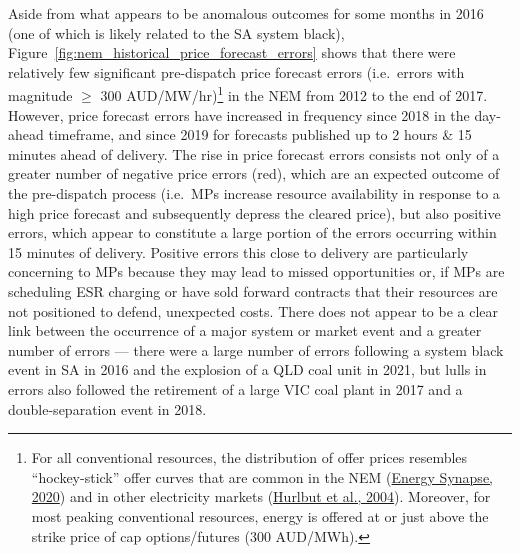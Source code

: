 \documentclass[12pt,a4paper,]{report}
\begin{document}
Aside from what appears to be anomalous outcomes for some months in 2016
(one of which is likely related to the SA system black),
Figure~\ref{fig:nem_historical_price_forecast_errors} shows that there
were relatively few significant pre-dispatch price forecast errors
(i.e.~errors with magnitude \(\geq\) 300 AUD/MW/hr)\footnote{For all
  conventional resources, the distribution of offer prices resembles
  ``hockey-stick'' offer curves that are common in the NEM
  (\protect\hyperlink{ref-energysynapseDemandResponseNational2020}{Energy
  Synapse, 2020}) and in other electricity markets
  (\protect\hyperlink{ref-hurlbutProtectingMarketHockey2004}{Hurlbut et
  al., 2004}). Moreover, for most peaking conventional resources, energy
  is offered at or just above the strike price of cap options/futures
  (300 AUD/MWh).} in the NEM from 2012 to the end of 2017. However,
price forecast errors have increased in frequency since 2018 in the
day-ahead timeframe, and since 2019 for forecasts published up to 2
hours \& 15 minutes ahead of delivery. The rise in price forecast errors
consists not only of a greater number of negative price errors (red),
which are an expected outcome of the pre-dispatch process (i.e.~MPs
increase resource availability in response to a high price forecast and
subsequently depress the cleared price), but also positive errors, which
appear to constitute a large portion of the errors occurring within 15
minutes of delivery. Positive errors this close to delivery are
particularly concerning to MPs because they may lead to missed
opportunities or, if MPs are scheduling ESR charging or have sold
forward contracts that their resources are not positioned to defend,
unexpected costs. There does not appear to be a clear link between the
occurrence of a major system or market event and a greater number of
errors --- there were a large number of errors following a system black
event in SA in 2016 and the explosion of a QLD coal unit in 2021, but
lulls in errors also followed the retirement of a large VIC coal plant
in 2017 and a double-separation event in 2018.
\end{document}

